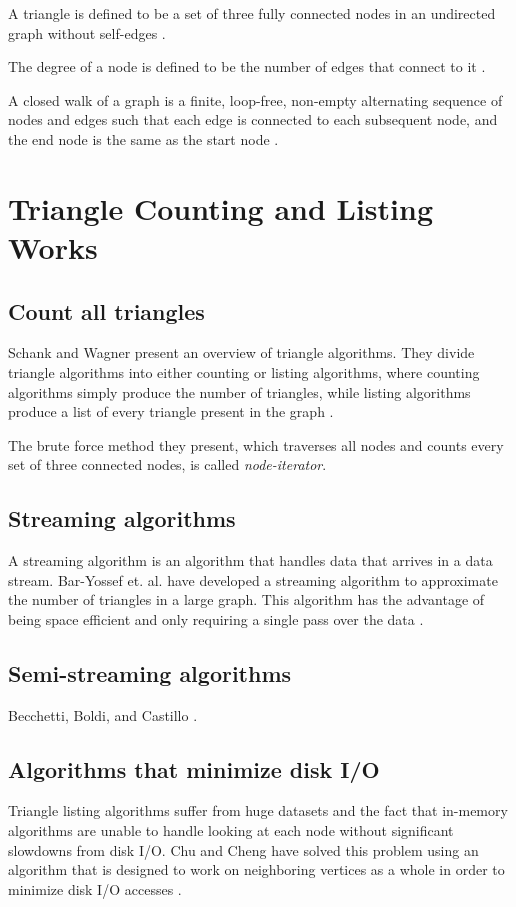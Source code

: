 \documentclass{acm_proc_article-sp}
\begin{document}
A triangle is defined to be a set of three fully connected nodes in an
undirected graph without self-edges \cite{original}.

The degree of a node is defined to be the number of edges that connect to it
\cite{diestel}.

A closed walk of a graph is a finite, loop-free, non-empty alternating sequence
of nodes and edges such that each edge is connected to each subsequent node,
and the end node is the same as the start node \cite{diestel}.

\section{Triangle Counting and Listing Works}

\subsection{Count all triangles}
Schank and Wagner present an overview of triangle algorithms. They divide
triangle algorithms into either counting or listing algorithms, where counting
algorithms simply produce the number of triangles, while listing algorithms
produce a list of every triangle present in the graph \cite{schank}.

The brute force method they present, which traverses all nodes and counts every
set of three connected nodes, is called \textit{node-iterator}.

\subsection{Streaming algorithms}
A streaming algorithm is an algorithm that handles data that arrives in a
data stream. Bar-Yossef et. al. have developed a streaming algorithm to
approximate the number of triangles in a large graph. This algorithm has the
advantage of being space efficient and only requiring a single pass over the
data \cite{baryossef}. 

\subsection{Semi-streaming algorithms}
Becchetti, Boldi, and Castillo \cite{becchetti}.

\subsection{Algorithms that minimize disk I/O}
Triangle listing algorithms suffer from huge datasets and the fact that
in-memory algorithms are unable to handle looking at each node without
significant slowdowns from disk I/O. Chu and Cheng have solved this problem
using an algorithm that is designed to work on neighboring vertices as a whole
in order to minimize disk I/O accesses \cite{chu}.
\end{document}
